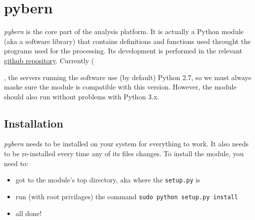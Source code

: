\chapter{pybern}
\label{ch:pybern}

\emph{pybern} is the core part of the analysis platform. It is 
actually a Python module (aka a software library) that contains definitions and 
functions used throught the programs used for the processing. Its development 
is performed in the relevant \href{https://github.com/DSOlab/autobern}{github repository}. 
Currently (\date), the servers running the software use (by default) Python 2.7, 
so we must always maske sure the module is compatible with this version. However, 
the module should also run without problems with Python 3.x.

\section{Installation}
\label{sec:pybern-installation}
\emph{pybern} needs to be installed on your system for everything to work. It also 
needs to be re-installed every time any of its files changes. To install the 
module, you need to:
\begin{itemize}
  \item got to the module's top directory, aka where the \verb|setup.py| is
  \item run (with root privilages) the command \verb|sudo python setup.py install|
  \item all done!
\end{itemize}

